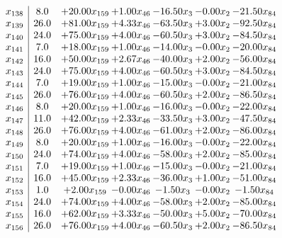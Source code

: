 \documentclass[8pt]{article}
\begin{document}
\[\begin{array}{c| c c@{\hskip 2pt} c@{\hskip 2pt} c@{\hskip 2pt} c@{\hskip 2pt} c@{\hskip 2pt} }
 x_{138}   &  8.0 & + 20.00 x_{159} & +  1.00 x_{46} & -16.50 x_{3} & -0.00 x_{2} & -21.50 x_{84}\\
 x_{139}   &  26.0 & + 81.00 x_{159} & +  4.33 x_{46} & -63.50 x_{3} & +  3.00 x_{2} & -92.50 x_{84}\\
 x_{140}   &  24.0 & + 75.00 x_{159} & +  4.00 x_{46} & -60.50 x_{3} & +  3.00 x_{2} & -84.50 x_{84}\\
 x_{141}   &  7.0 & + 18.00 x_{159} & +  1.00 x_{46} & -14.00 x_{3} & -0.00 x_{2} & -20.00 x_{84}\\
 x_{142}   &  16.0 & + 50.00 x_{159} & +  2.67 x_{46} & -40.00 x_{3} & +  2.00 x_{2} & -56.00 x_{84}\\
 x_{143}   &  24.0 & + 75.00 x_{159} & +  4.00 x_{46} & -60.50 x_{3} & +  3.00 x_{2} & -84.50 x_{84}\\
 x_{144}   &  7.0 & + 19.00 x_{159} & +  1.00 x_{46} & -15.00 x_{3} & -0.00 x_{2} & -21.00 x_{84}\\
 x_{145}   &  26.0 & + 76.00 x_{159} & +  4.00 x_{46} & -60.50 x_{3} & +  2.00 x_{2} & -86.50 x_{84}\\
 x_{146}   &  8.0 & + 20.00 x_{159} & +  1.00 x_{46} & -16.00 x_{3} & -0.00 x_{2} & -22.00 x_{84}\\
 x_{147}   &  11.0 & + 42.00 x_{159} & +  2.33 x_{46} & -33.50 x_{3} & +  3.00 x_{2} & -47.50 x_{84}\\
 x_{148}   &  26.0 & + 76.00 x_{159} & +  4.00 x_{46} & -61.00 x_{3} & +  2.00 x_{2} & -86.00 x_{84}\\
 x_{149}   &  8.0 & + 20.00 x_{159} & +  1.00 x_{46} & -16.00 x_{3} & -0.00 x_{2} & -22.00 x_{84}\\
 x_{150}   &  24.0 & + 74.00 x_{159} & +  4.00 x_{46} & -58.00 x_{3} & +  2.00 x_{2} & -85.00 x_{84}\\
 x_{151}   &  7.0 & + 19.00 x_{159} & +  1.00 x_{46} & -15.00 x_{3} & -0.00 x_{2} & -21.00 x_{84}\\
 x_{152}   &  16.0 & + 45.00 x_{159} & +  2.33 x_{46} & -36.00 x_{3} & +  1.00 x_{2} & -51.00 x_{84}\\
 x_{153}   &  1.0 & +  2.00 x_{159} & -0.00 x_{46} & -1.50 x_{3} & -0.00 x_{2} & -1.50 x_{84}\\
 x_{154}   &  24.0 & + 74.00 x_{159} & +  4.00 x_{46} & -58.00 x_{3} & +  2.00 x_{2} & -85.00 x_{84}\\
 x_{155}   &  16.0 & + 62.00 x_{159} & +  3.33 x_{46} & -50.00 x_{3} & +  5.00 x_{2} & -70.00 x_{84}\\
 x_{156}   &  26.0 & + 76.00 x_{159} & +  4.00 x_{46} & -60.50 x_{3} & +  2.00 x_{2} & -86.50 x_{84}\\

\end{array}\]
\end{document}
